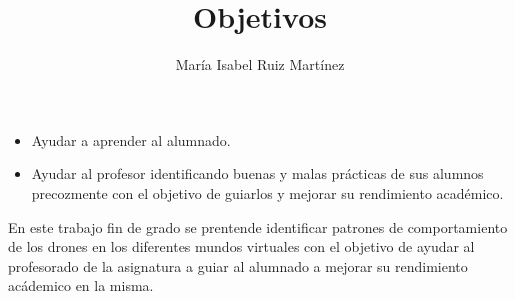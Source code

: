 \documentclass[10pt,a4paper]{article}
\author{María Isabel Ruiz Martínez}
\title{Objetivos}
\begin{document}
\maketitle

\begin{itemize}
\item Ayudar a aprender al alumnado.
\item Ayudar al profesor identificando buenas y malas prácticas de sus alumnos precozmente con el objetivo de guiarlos y mejorar su rendimiento académico.
\end{itemize}

En este trabajo fin de grado se prentende identificar patrones de comportamiento de los drones en los diferentes mundos virtuales con el objetivo de ayudar al profesorado de la asignatura a guiar al alumnado a mejorar su rendimiento acádemico en la misma.
\end{document}
